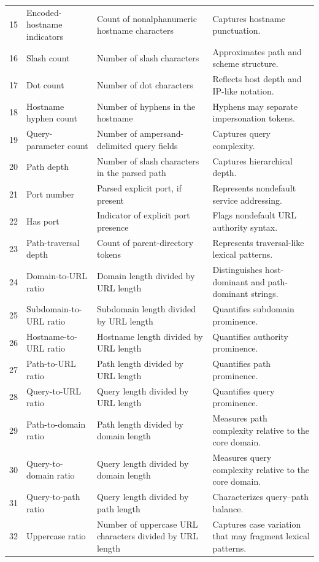 \documentclass[10pt]{article}
\begin{document}
\begin{longtable}{r L{3.4cm} L{5.1cm} L{6.0cm}}
15 & Encoded-hostname indicators & Count of nonalphanumeric hostname characters & Captures hostname punctuation. \\
16 & Slash count & Number of slash characters & Approximates path and scheme structure. \\
17 & Dot count & Number of dot characters & Reflects host depth and IP-like notation. \\
18 & Hostname hyphen count & Number of hyphens in the hostname & Hyphens may separate impersonation tokens. \\
19 & Query-parameter count & Number of ampersand-delimited query fields & Captures query complexity. \\
20 & Path depth & Number of slash characters in the parsed path & Captures hierarchical depth. \\
21 & Port number & Parsed explicit port, if present & Represents nondefault service addressing. \\
22 & Has port & Indicator of explicit port presence & Flags nondefault URL authority syntax. \\
23 & Path-traversal depth & Count of parent-directory tokens & Represents traversal-like lexical patterns. \\
24 & Domain-to-URL ratio & Domain length divided by URL length & Distinguishes host-dominant and path-dominant strings. \\
25 & Subdomain-to-URL ratio & Subdomain length divided by URL length & Quantifies subdomain prominence. \\
26 & Hostname-to-URL ratio & Hostname length divided by URL length & Quantifies authority prominence. \\
27 & Path-to-URL ratio & Path length divided by URL length & Quantifies path prominence. \\
28 & Query-to-URL ratio & Query length divided by URL length & Quantifies query prominence. \\
29 & Path-to-domain ratio & Path length divided by domain length & Measures path complexity relative to the core domain. \\
30 & Query-to-domain ratio & Query length divided by domain length & Measures query complexity relative to the core domain. \\
31 & Query-to-path ratio & Query length divided by path length & Characterizes query--path balance. \\
32 & Uppercase ratio & Number of uppercase URL characters divided by URL length & Captures case variation that may fragment lexical patterns. \\

\end{longtable}
\end{document}
